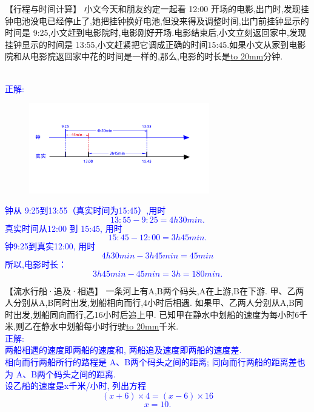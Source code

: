 \item {
    【行程与时间计算】
    小文今天和朋友约定一起看 12:00 开场的电影,出门时,发现挂钟电池没电已经停止了,她把挂钟换好电池,但没来得及调整时间,出门前挂钟显示的时间是 9:25,小文赶到电影院时,电影刚好开场.电影结束后,小文立刻返回家中,发现挂钟显示的时间是 13:55,小文赶紧把它调成正确的时间15:45.如果小文从家到电影院和从电影院返回家中花的时间是一样的,那么,电影的时长是\underline{\hbox to 20mm{}}分钟.
    \ifshowSolution{}
        \fangsong{}\textcolor{blue}{
            \\正解:
            \begin{figure}[H] 
                \centering
                \includegraphics[width=0.7\textwidth]{./pics/Chapter_3/seikai_8.png}
            \end{figure}
            钟从 9:25到13:55（真实时间为15:45）,用时 
            \[ 13:55 - 9:25 = 4h 30 min. \]
            真实时间从12:00 到 15:45, 用时
            \[ 15:45 - 12:00 = 3h 45 min. \]
            钟9:25到真实12:00, 用时
            \[
                4h 30min - 3h 45 min = 45min
            \]
            所以,电影时长：
            \[3h 45min - 45min = 3h = 180min. \]
        }
    \else
        \vspace{2cm}
    \fi
}

\item {
    【流水行船·追及·相遇】
    一条河上有A,B两个码头,A在上游,B在下游. 甲、乙两人分别从A,B同时出发,划船相向而行,4小时后相遇. 如果甲、乙两人分别从A,B同时出发,划船同向而行,乙16小时后追上甲. 已知甲在静水中划船的速度为每小时6千米,则乙在静水中划船每小时行驶\underline{\hbox to 20mm{}}千米.
    \ifshowSolution{}
        \fangsong{}\textcolor{blue}{
            \\正解:\\
            两船相遇的速度即两船的速度和, 两船追及速度即两船的速度差.\\
            相向而行两船所行的路程是 A、B两个码头之间的距离; 同向而行两船的距离差也为 A、B两个码头之间的距离. \\
            设乙船的速度是x千米/小时, 列出方程 
            \[(x+6)\times 4=(x-6)\times 16 \]
            \[ x=10. \]
        }
    \else
        \vspace{2cm}
    \fi
}
